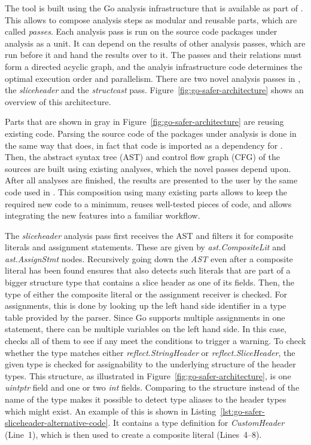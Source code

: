 The \toolSafer{} tool is built using the Go analysis infrastructure that is available as part of \toolVet{}.
This allows to compose analysis steps as modular and reusable parts, which are called \textit{passes}.
Each analysis pass is run on the source code packages under analysis as a unit.
It can depend on the results of other analysis passes, which are run before it and hand the results over to it.
The passes and their relations must form a directed acyclic graph, and the analyis infrastructure code determines the
optimal execution order and parallelism.
There are two novel analysis passes in \toolSafer{}, the \textit{sliceheader} and the \textit{structcast} pass.
Figure~\ref{fig:go-safer-architecture} shows an overview of this architecture.



Parts that are shown in gray in Figure~\ref{fig:go-safer-architecture} are reusing existing code.
Parsing the source code of the packages under analysis is done in the same way that \toolVet{} does, in fact that code
is imported as a dependency for \toolSafer{}.
Then, the abstract syntax tree (\acrshort{AST}) and control flow graph (\acrshort{CFG}) of the sources are built using
existing analyses, which the novel \toolSafer{} passes depend upon.
After all analyses are finished, the results are presented to the user by the same code used in \toolVet{}.
This composition using many existing parts allows to keep the required new code to a minimum, reuses well-tested pieces
of code, and allows integrating the new \toolSafer{} features into a familiar workflow.

The \textit{sliceheader} analysis pass first receives the \acrshort{AST} and filters it for composite literals and
assignment statements.
These are given by \textit{ast.CompositeLit} and \textit{ast.AssignStmt} nodes.
Recursively going down the \textit{AST} even after a composite literal has been found ensures that \toolSafer{} also
detects such literals that are part of a bigger structure type that contains a slice header as one of its fields.
Then, the type of either the composite literal or the assignment receiver is checked.
For assignments, this is done by looking up the left hand side identifier in a type table provided by the parser.
Since Go supports multiple assignments in one statement, there can be multiple variables on the left hand side.
In this case, \toolSafer{} checks all of them to see if any meet the conditions to trigger a warning.
To check whether the type matches either \textit{reflect.StringHeader} or \textit{reflect.SliceHeader}, the given type
is checked for assignability to the underlying structure of the header types.
This structure, as illustrated in Figure~\ref{fig:go-safer-architecture}, is one \textit{uintptr} field and one or two
\textit{int} fields.
Comparing to the structure instead of the name of the type makes it possible to detect type aliases to the header types
which might exist.
An example of this is shown in Listing~\ref{lst:go-safer-sliceheader-alternative-code}.
It contains a type definition for \textit{CustomHeader} (Line~1), which is then used to create a composite literal
(Lines~4--8).


